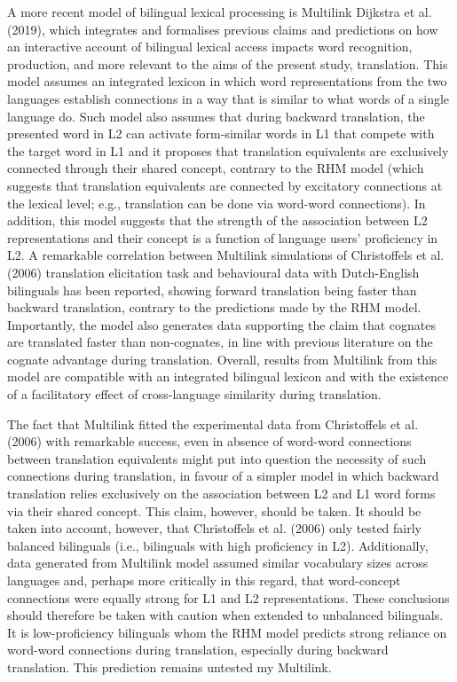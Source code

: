 \documentclass[
  english,
  man,floatsintext]{apa6}
\begin{document}
A more recent model of bilingual lexical processing is Multilink Dijkstra et al. (2019), which integrates and formalises previous claims and predictions on how an interactive account of bilingual lexical access impacts word recognition, production, and more relevant to the aims of the present study, translation. This model assumes an integrated lexicon in which word representations from the two languages establish connections in a way that is similar to what words of a single language do. Such model also assumes that during backward translation, the presented word in L2 can activate form-similar words in L1 that compete with the target word in L1 and it proposes that translation equivalents are exclusively connected through their shared concept, contrary to the RHM model (which suggests that translation equivalents are connected by excitatory connections at the lexical level; e.g., translation can be done via word-word connections). In addition, this model suggests that the strength of the association between L2 representations and their concept is a function of language users' proficiency in L2. A remarkable correlation between Multilink simulations of Christoffels et al. (2006) translation elicitation task and behavioural data with Dutch-English bilinguals has been reported, showing forward translation being faster than backward translation, contrary to the predictions made by the RHM model. Importantly, the model also generates data supporting the claim that cognates are translated faster than non-cognates, in line with previous literature on the cognate advantage during translation. Overall, results from Multilink from this model are compatible with an integrated bilingual lexicon and with the existence of a facilitatory effect of cross-language similarity during translation.

The fact that Multilink fitted the experimental data from Christoffels et al. (2006) with remarkable success, even in absence of word-word connections between translation equivalents might put into question the necessity of such connections during translation, in favour of a simpler model in which backward translation relies exclusively on the association between L2 and L1 word forms via their shared concept. This claim, however, should be taken. It should be taken into account, however, that Christoffels et al. (2006) only tested fairly balanced bilinguals (i.e., bilinguals with high proficiency in L2). Additionally, data generated from Multilink model assumed similar vocabulary sizes across languages and, perhaps more critically in this regard, that word-concept connections were equally strong for L1 and L2 representations. These conclusions should therefore be taken with caution when extended to unbalanced bilinguals. It is low-proficiency bilinguals whom the RHM model predicts strong reliance on word-word connections during translation, especially during backward translation. This prediction remains untested my Multilink.
\end{document}
